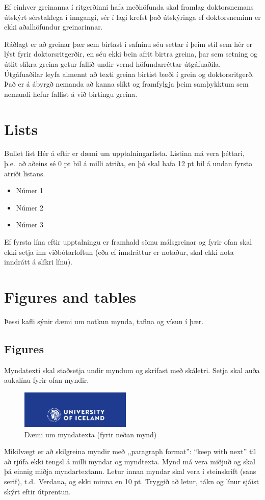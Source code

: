 \documentclass[a4paper,12pt,twoside,BCOR=10mm]{scrbook}
\begin{document}
Ef einhver greinanna í ritgerðinni hafa meðhöfunda skal framlag doktorsnemans útskýrt sérstaklega í inngangi, sér í lagi krefst það útskýringa ef doktorsneminn er ekki aðalhöfundur greinarinnar. 

Ráðlagt er að greinar þær sem birtast í safninu séu settar í þeim stíl sem hér er lýst fyrir doktorsritgerðir, en séu ekki bein afrit birtra greina, þar sem setning og útlit slíkra greina getur fallið undir vernd höfundarréttar útgáfuaðila. Útgáfuaðilar leyfa almennt að texti greina birtist bæði í grein og doktorsritgerð. Það er á ábyrgð nemanda að kanna slíkt og framfylgja þeim samþykktum sem nemandi hefur fallist á við birtingu greina.
 
\chapter{Lists}
Bullet list
Hér á eftir er dæmi um upptalningarlista. Listinn má vera þéttari, þ.e.\ að aðeins sé 0 pt bil á milli atriða, en þó skal hafa 12 pt bil á undan fyrsta atriði listans.
\begin{itemize}
 \item Númer 1
 \item Númer 2
 \item Númer 3
\end{itemize}
Ef fyrsta lína eftir upptalningu er framhald sömu málsgreinar og fyrir ofan skal ekki setja inn viðbótarloftun (eða ef inndráttur er notaður, skal ekki nota inndrátt á slíkri línu). 

\chapter{Figures and tables}\label{ch:figures and tables}
Þessi kafli sýnir dæmi um notkun mynda, taflna og vísun í þær.
\section{Figures}
Myndatexti skal staðsetja undir myndum og skrifast með skáletri.
Setja skal auða aukalínu fyrir ofan myndir.
\begin{figure}[!htb]
\centering
 \includegraphics[width=0.47\textwidth]{banner.png}
\caption[Dæmi um myndatexta (fyrir neðan mynd).]{Dæmi um myndatexta (fyrir neðan mynd)} \label{fig:logo}
\end{figure}
Mikilvægt er að skilgreina myndir með ,,paragraph format”: “keep with next” til að rjúfa ekki tengsl á milli myndar og myndtexta. Mynd má vera miðjuð og skal þá einnig miðja myndartextann. Letur innan myndar skal vera í steinskrift (sans serif), t.d.\ Verdana, og ekki minna en 10 pt. Tryggið að letur, tákn og línur sjáist skýrt eftir útprentun.
\end{document}
